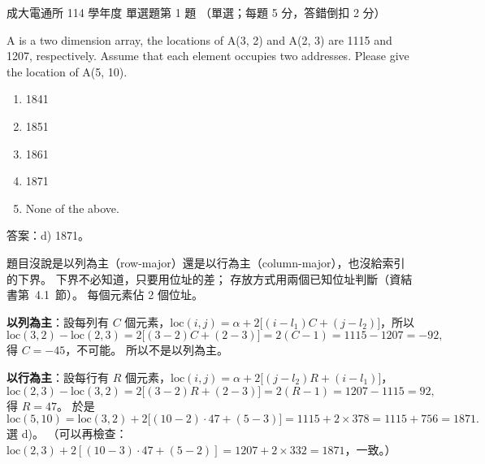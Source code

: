 \begin{pastexam}[label={px:ncku-114-cce-ds-01}]{成大電通所 114 學年度 單選題第 1 題}
（單選；每題 5 分，答錯倒扣 2 分）

A is a two dimension array, the locations of A(3, 2) and A(2, 3) are 1115 and 1207, respectively. Assume
that each element occupies two addresses. Please give the location of A(5, 10).
\begin{enumerate}[label=\alph*),nosep]
\item 1841
\item 1851
\item 1861
\item 1871
\item None of the above.
\end{enumerate}
\end{pastexam}

\begin{pastsoln}
答案：d) 1871。

題目沒說是以列為主（row-major）還是以行為主（column-major），也沒給索引的下界。 下界不必知道，只要用位址的差；
存放方式用兩個已知位址判斷（資結書第~4.1~節）。 每個元素佔 2 個位址。

\textbf{以列為主}：設每列有 $C$ 個元素，$\mathrm{loc}(i, j) = \alpha + 2\bigl[(i - l_1)C + (j - l_2)\bigr]$，所以
\[
\mathrm{loc}(3, 2) - \mathrm{loc}(2, 3) = 2\bigl[(3 - 2)C + (2 - 3)\bigr] = 2(C - 1) = 1115 - 1207 = -92,
\]
得 $C = -45$，不可能。 所以不是以列為主。

\textbf{以行為主}：設每行有 $R$ 個元素，$\mathrm{loc}(i, j) = \alpha + 2\bigl[(j - l_2)R + (i - l_1)\bigr]$，
\[
\mathrm{loc}(2, 3) - \mathrm{loc}(3, 2) = 2\bigl[(3 - 2)R + (2 - 3)\bigr] = 2(R - 1) = 1207 - 1115 = 92,
\]
得 $R = 47$。 於是
\[
\mathrm{loc}(5, 10) = \mathrm{loc}(3, 2) + 2\bigl[(10 - 2) \cdot 47 + (5 - 3)\bigr] = 1115 + 2 \times 378 = 1115 + 756 = 1871.
\]
選 d)。 （可以再檢查：$\mathrm{loc}(2, 3) + 2[(10 - 3) \cdot 47 + (5 - 2)] = 1207 + 2 \times 332 = 1871$，一致。）
\end{pastsoln}
